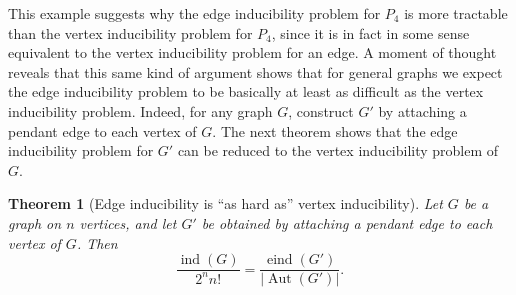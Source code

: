 \documentclass[reqno,11pt]{amsart}
\numberwithin{equation}{section}
\newtheorem{theorem}{Theorem}[section]
\theoremstyle{definition}
\theoremstyle{remark}
\DeclareMathOperator{\ind}{ind}
\DeclareMathOperator{\eind}{eind}
\DeclareMathOperator{\Aut}{Aut}
\begin{document}
This example suggests why the edge inducibility problem for $P_4$ is more tractable than the vertex inducibility problem for $P_4$, since it is in fact in some sense equivalent to the vertex inducibility problem for an edge. A moment of thought reveals that this same kind of argument shows that for general graphs we expect the edge inducibility problem to be basically at least as difficult as the vertex inducibility problem. Indeed, for any graph $G$, construct $G'$ by attaching a pendant edge to each vertex of $G$. The next theorem shows that the edge inducibility problem for $G'$ can be reduced to the vertex inducibility problem of $G$. 

\begin{theorem}[Edge inducibility is ``as hard as'' vertex inducibility]\label{thm:eind-as-hard-as-ind}
    Let $G$ be a graph on $n$ vertices, and let $G'$ be obtained by attaching a pendant edge to each vertex of $G$. Then
\[ \frac{\ind(G)}{2^n n!}=\frac{ \eind(G')}{|\Aut(G')|} . \]
\end{theorem}
\end{document}
